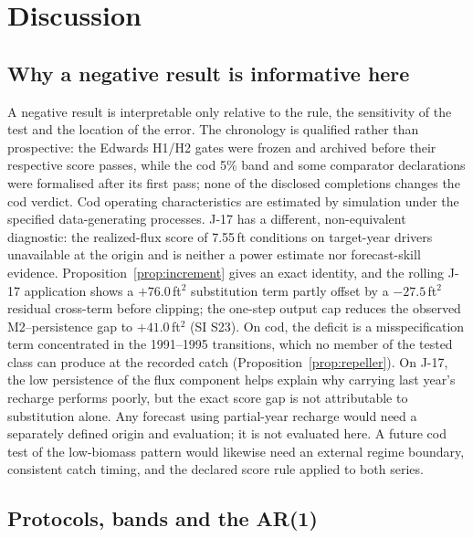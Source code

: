 \documentclass[preprint,11pt,authoryear]{elsarticle}
\theoremstyle{definition}
\theoremstyle{remark}
\begin{document}
\section{Discussion}\label{sec:discussion}

\subsection{Why a negative result is informative here}\label{sec:whyinformative}

A negative result is interpretable only relative to the rule, the sensitivity of the test and the location of the error. The chronology is qualified rather than prospective: the Edwards H1/H2 gates were frozen and archived before their respective score passes, while the cod 5\% band and some comparator declarations were formalised after its first pass; none of the disclosed completions changes the cod verdict. Cod operating characteristics are estimated by simulation under the specified data-generating processes. J-17 has a different, non-equivalent diagnostic: the realized-flux score of 7.55\,ft conditions on target-year drivers unavailable at the origin and is neither a power estimate nor forecast-skill evidence. Proposition~\ref{prop:increment} gives an exact identity, and the rolling J-17 application shows a $+76.0$\,ft$^2$ substitution term partly offset by a $-27.5$\,ft$^2$ residual cross-term before clipping; the one-step output cap reduces the observed M2--persistence gap to $+41.0$\,ft$^2$ (SI S23). On cod, the deficit is a misspecification term concentrated in the 1991--1995 transitions, which no member of the tested class can produce at the recorded catch (Proposition~\ref{prop:repeller}). On J-17, the low persistence of the flux component helps explain why carrying last year's recharge performs poorly, but the exact score gap is not attributable to substitution alone. Any forecast using partial-year recharge would need a separately defined origin and evaluation; it is not evaluated here. A future cod test of the low-biomass pattern would likewise need an external regime boundary, consistent catch timing, and the declared score rule applied to both series.

\subsection{Protocols, bands and the AR(1)}\label{sec:protocoldiff}
\end{document}
